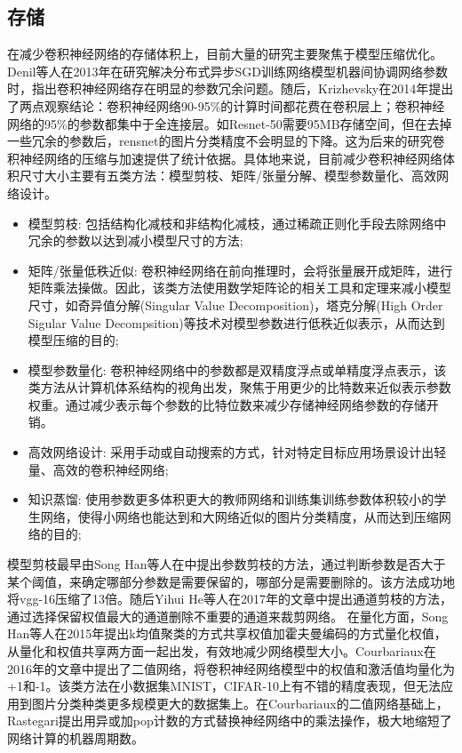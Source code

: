 \subsection{存储}
在减少卷积神经网络的存储体积上，目前大量的研究主要聚焦于模型压缩优化。Denil\cite{denil2013predicting}等人在2013年在研究解决分布式异步SGD训练网络模型机器间协调网络参数时，指出卷积神经网络存在明显的参数冗余问题。随后，Krizhevsky在2014年\cite{krizhevsky2012imagenet}提出了两点观察结论：卷积神经网络90-95\%的计算时间都花费在卷积层上；卷积神经网络的95\%的参数都集中于全连接层。如Resnet-50需要95MB存储空间，但在去掉一些冗余的参数后，rensnet的图片分类精度不会明显的下降。这为后来的研究卷积神经网络的压缩与加速提供了统计依据。具体地来说，目前减少卷积神经网络体积尺寸大小主要有五类方法：模型剪枝、矩阵/张量分解、模型参数量化、高效网络设计。

\begin{itemize}
    \item 模型剪枝: 包括结构化减枝和非结构化减枝，通过稀疏正则化手段去除网络中冗余的参数以达到减小模型尺寸的方法;
    \item 矩阵/张量低秩近似: 卷积神经网络在前向推理时，会将张量展开成矩阵，进行矩阵乘法操做。因此，该类方法使用数学矩阵论的相关工具和定理来减小模型尺寸，如奇异值分解(Singular Value Decomposition)，塔克分解(High Order Sigular Value Decompsition)等技术对模型参数进行低秩近似表示，从而达到模型压缩的目的;
    \item 模型参数量化: 卷积神经网络中的参数都是双精度浮点或单精度浮点表示，该类方法从计算机体系结构的视角出发，聚焦于用更少的比特数来近似表示参数权重。通过减少表示每个参数的比特位数来减少存储神经网络参数的存储开销。
    \item 高效网络设计: 采用手动或自动搜索的方式，针对特定目标应用场景设计出轻量、高效的卷积神经网络;
    \item 知识蒸馏: 使用参数更多体积更大的教师网络和训练集训练参数体积较小的学生网络，使得小网络也能达到和大网络近似的图片分类精度，从而达到压缩网络的目的;
\end{itemize}
模型剪枝最早由Song Han等人在\cite{han2015learning}中提出参数剪枝的方法，通过判断参数是否大于某个阈值，来确定哪部分参数是需要保留的，哪部分是需要删除的。该方法成功地将vgg-16压缩了13倍。随后Yihui He等人在2017年的文章中\cite{he2017channel}提出通道剪枝的方法，通过选择保留权值最大的通道删除不重要的通道来裁剪网络。
在量化方面，Song Han等人在2015年\cite{han2015deep}提出k均值聚类的方式共享权值加霍夫曼编码的方式量化权值，从量化和权值共享两方面一起出发，有效地减少网络模型大小。Courbariaux在2016年的文章中\cite{courbariaux2016binarized}提出了二值网络，将卷积神经网络模型中的权值和激活值均量化为+1和-1。该类方法在小数据集MNIST，CIFAR-10上有不错的精度表现，但无法应用到图片分类种类更多规模更大的数据集上。在Courbariaux的二值网络基础上，Rastegari提出\cite{rastegari2016xnor}用异或加pop计数的方式替换神经网络中的乘法操作，极大地缩短了网络计算的机器周期数。
